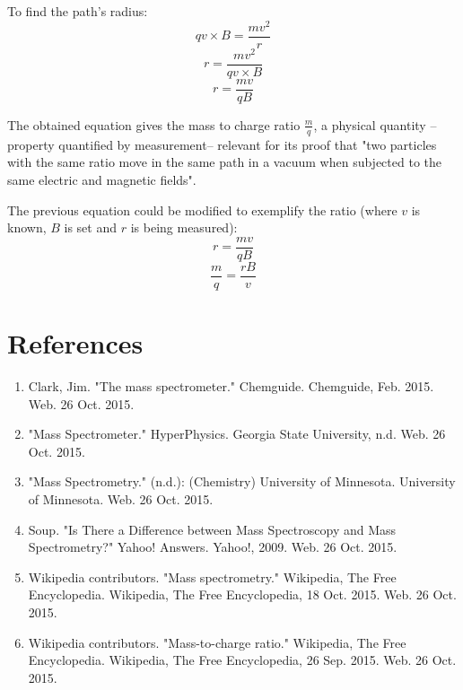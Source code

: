 \documentclass{article}
\begin{document}
To find the path's radius:
$$qv \times B = \frac{mv^2}{r}$$
$$r=\frac{mv^2}{qv \times B}$$
$$r=\frac{mv}{qB}$$

The obtained equation gives the mass to charge ratio $\frac{m}{q}$, a physical quantity –property quantified by measurement– relevant for its proof that "two particles with the same ratio move in the same path in a vacuum when subjected to the same electric and magnetic fields". 

\newpage

The previous equation could be modified to exemplify the ratio (where $v$ is known, $B$ is set and $r$ is being measured):
$$r=\frac{mv}{qB}$$
$$\frac{m}{q}=\frac{rB}{v}$$


\section{References}

\begin{enumerate}[leftmargin=!,labelindent=5pt,itemindent=-15pt]

\item Clark, Jim. "The mass spectrometer." Chemguide. Chemguide, Feb. 2015. Web. 26 Oct. 2015.
\item "Mass Spectrometer." HyperPhysics. Georgia State University, n.d. Web. 26 Oct. 2015.
\item "Mass Spectrometry." (n.d.): (Chemistry) University of Minnesota. University of Minnesota. Web. 26 Oct. 2015.
\item Soup. "Is There a Difference between Mass Spectroscopy and Mass Spectrometry?" Yahoo! Answers. Yahoo!, 2009. Web. 26 Oct. 2015.
\item Wikipedia contributors. "Mass spectrometry." Wikipedia, The Free Encyclopedia. Wikipedia, The Free Encyclopedia, 18 Oct. 2015. Web. 26 Oct. 2015.
\item Wikipedia contributors. "Mass-to-charge ratio." Wikipedia, The Free Encyclopedia. Wikipedia, The Free Encyclopedia, 26 Sep. 2015. Web. 26 Oct. 2015.

\end{enumerate}
\end{document}
